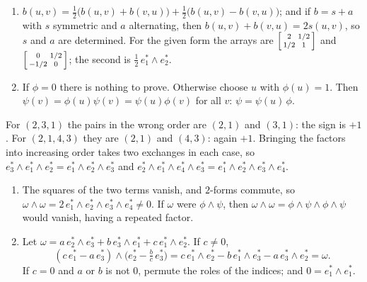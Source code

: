\begin{enumerate}[nosep]
  \item $b(u, v) = \frac12\bigl(b(u, v) + b(v, u)\bigr)
        + \frac12\bigl(b(u, v) - b(v, u)\bigr)$; and if
        $b = s + a$ with $s$ symmetric and $a$ alternating, then
        $b(u, v) + b(v, u) = 2s(u, v)$, so $s$ and $a$ are determined.
        For the given form the arrays are
        $\begin{bsmallmatrix}2 & 1/2\\ 1/2 & 1\end{bsmallmatrix}$ and
        $\begin{bsmallmatrix}0 & 1/2\\ -1/2 & 0\end{bsmallmatrix}$; the
        second is $\frac12\,e_1^*\wedge e_2^*$.
  \item If $\phi = 0$ there is nothing to prove. Otherwise choose $u$
        with $\phi(u) = 1$. Then
        $\psi(v) = \phi(u)\psi(v) = \psi(u)\phi(v)$ for all $v$:
        $\psi = \psi(u)\,\phi$.
\end{enumerate}

For $(2, 3, 1)$ the pairs in the wrong order are $(2, 1)$ and $(3, 1)$:
the sign is $+1$. For $(2, 1, 4, 3)$ they are $(2, 1)$ and $(4, 3)$:
again $+1$. Bringing the factors into increasing order takes two
exchanges in each case, so
$e_3^*\wedge e_1^*\wedge e_2^* = e_1^*\wedge e_2^*\wedge e_3^*$ and
$e_2^*\wedge e_1^*\wedge e_4^*\wedge e_3^*
= e_1^*\wedge e_2^*\wedge e_3^*\wedge e_4^*$.

\begin{enumerate}[nosep]
  \item The squares of the two terms vanish, and $2$-forms commute, so
        $\omega\wedge\omega
        = 2\,e_1^*\wedge e_2^*\wedge e_3^*\wedge e_4^*\neq0$. If
        $\omega$ were $\phi\wedge\psi$, then
        $\omega\wedge\omega = \phi\wedge\psi\wedge\phi\wedge\psi$ would
        vanish, having a repeated factor.
  \item Let $\omega = a\,e_2^*\wedge e_3^* + b\,e_3^*\wedge e_1^*
        + c\,e_1^*\wedge e_2^*$. If $c\neq0$,
        \[
          (c\,e_1^* - a\,e_3^*)\wedge\bigl(e_2^* - \tfrac bc\,e_3^*\bigr)
          = c\,e_1^*\wedge e_2^* - b\,e_1^*\wedge e_3^*
            - a\,e_3^*\wedge e_2^* = \omega .
        \]
        If $c = 0$ and $a$ or $b$ is not $0$, permute the roles of the
        indices; and $0 = e_1^*\wedge e_1^*$.
\end{enumerate}

